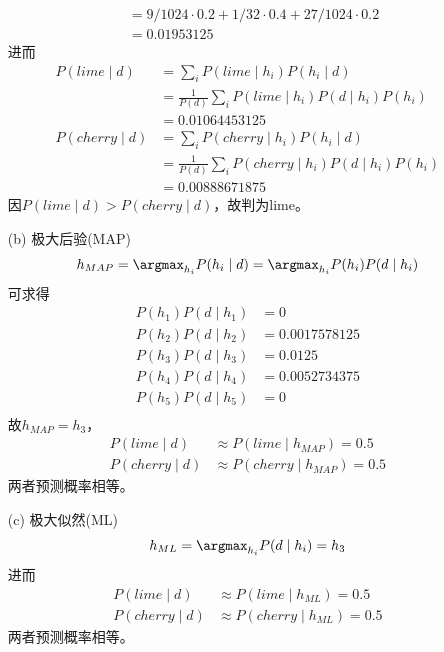 \documentclass[a4paper, 11pt]{article}
\begin{document}
\begin{answer}
\begin{itemize}
\[\begin{aligned}
        &=9/1024\cdot 0.2 + 1/32\cdot 0.4 + 27/1024\cdot 0.2\\
        &=0.01953125
    \end{aligned}\]
    进而
    \[\begin{aligned}
        P(lime \mid d)&=\sum_{i}P(lime\mid h_i)P(h_i\mid d)\\
        &=\frac{1}{P(d)}\sum_iP(lime\mid h_i)P(d\mid h_i)P(h_i)\\
        &=0.01064453125\\
        P(cherry \mid d)&=\sum_{i}P(cherry\mid h_i)P(h_i\mid d)\\
        &=\frac{1}{P(d)}\sum_iP(cherry\mid h_i)P(d\mid h_i)P(h_i)\\
        &=0.00888671875
    \end{aligned}\]
    因$P(lime \mid d)>P(cherry \mid d)$，故判为lime。
    \item [(b)] 极大后验(MAP)
    \[h_{MAP}=\argmax_{h_i} P(h_i\mid d)=\argmax_{h_i} P(h_i)P(d\mid h_i)\]
    可求得
    \[\begin{aligned}
        P(h_1)P(d\mid h_1) &= 0\\
        P(h_2)P(d\mid h_2) &= 0.0017578125\\
        P(h_3)P(d\mid h_3) &= 0.0125\\
        P(h_4)P(d\mid h_4) &= 0.0052734375\\
        P(h_5)P(d\mid h_5) &= 0\\
    \end{aligned}\]
    故$h_{MAP}=h_3$，
    \[\begin{aligned}
        P(lime\mid d)&\approx P(lime\mid h_{MAP})=0.5\\
        P(cherry\mid d)&\approx P(cherry\mid h_{MAP})=0.5
    \end{aligned}\]
    两者预测概率相等。
    \item [(c)] 极大似然(ML)
    \[h_{ML}=\argmax_{h_i} P(d\mid h_i)=h_3\]
    进而
    \[\begin{aligned}
        P(lime\mid d)&\approx P(lime\mid h_{ML})=0.5\\
        P(cherry\mid d)&\approx P(cherry\mid h_{ML})=0.5
    \end{aligned}\]
    两者预测概率相等。
\end{itemize}
\end{answer}
\end{document}
